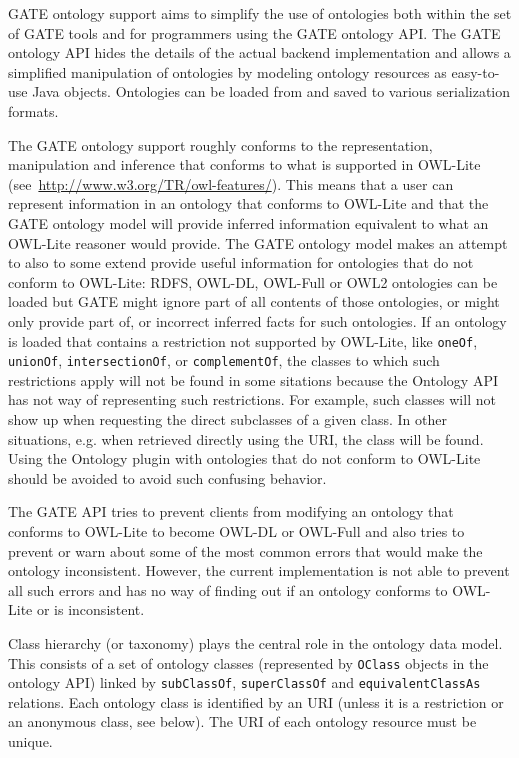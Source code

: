 GATE ontology support aims to simplify the use of ontologies both 
within the set of GATE tools and for programmers using the GATE ontology
API. The GATE ontology API hides the details of the actual backend
implementation and allows a simplified manipulation of 
ontologies by modeling ontology resources as easy-to-use Java objects.
Ontologies can be loaded from and saved to various serialization 
formats. 

The GATE ontology support roughly conforms to the representation, 
manipulation and inference that conforms to what is supported in
OWL-Lite (see~\url{http://www.w3.org/TR/owl-features/}).
This means that a user can represent information in an ontology that
conforms to OWL-Lite and that the GATE ontology model will provide
inferred information equivalent to what an OWL-Lite reasoner 
would provide. The GATE ontology model makes an attempt to also
to some extend provide useful information for ontologies that do
not conform to OWL-Lite: RDFS, OWL-DL, OWL-Full or OWL2 ontologies
can be loaded but GATE might ignore part of all contents of
those ontologies, or might only provide part of, or incorrect 
inferred facts for such ontologies. If an ontology is loaded that 
contains a restriction not supported by OWL-Lite, like \texttt{oneOf},
\texttt{unionOf}, \texttt{intersectionOf}, or \texttt{complementOf},
the classes to which such restrictions apply will not be found in 
some sitations because the Ontology API has not way of representing
such restrictions. For example, such classes will not show up when
requesting the direct subclasses of a given class. In other situations,
e.g. when retrieved directly using the URI, the class will be found.
Using the Ontology plugin with ontologies that do not conform to 
OWL-Lite should be avoided to avoid such confusing behavior.

The GATE API tries to prevent clients from modifying an ontology
that conforms to OWL-Lite to become OWL-DL or OWL-Full and also
tries to prevent or warn about some of the most common errors that
would make the ontology inconsistent. However, the current implementation
is not able to prevent all such errors and has no way of finding out
if an ontology conforms to OWL-Lite or is inconsistent.




Class hierarchy (or taxonomy) plays the central role in the ontology data model. This consists of a set of ontology classes 
(represented by \verb!OClass! objects in the ontology API)
linked by \texttt{subClassOf},
\texttt{superClassOf} and \texttt{equivalentClassAs} relations. Each ontology class 
is identified by an URI 
(unless it is a restriction or an anonymous class, see below).
The URI of each ontology resource must be unique.

